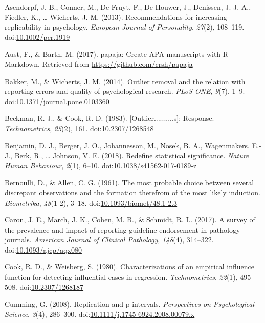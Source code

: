 \documentclass[english,,man,mask]{apa6}
\theoremstyle{definition}
\theoremstyle{definition}
\theoremstyle{definition}
\theoremstyle{remark}
\begin{document}
\hypertarget{refs}{}
\hypertarget{ref-Asendorpf2012}{}
Asendorpf, J. B., Conner, M., De Fruyt, F., De Houwer, J., Denissen, J.
J. A., Fiedler, K., \ldots{} Wicherts, J. M. (2013). Recommendations for
increasing replicability in psychology. \emph{European Journal of
Personality}, \emph{27}(2), 108--119.
doi:\href{https://doi.org/10.1002/per.1919}{10.1002/per.1919}

\hypertarget{ref-Aust2017}{}
Aust, F., \& Barth, M. (2017). papaja: Create APA manuscripts with R
Markdown. Retrieved from \url{https://github.com/crsh/papaja}

\hypertarget{ref-Bakker2014}{}
Bakker, M., \& Wicherts, J. M. (2014). Outlier removal and the relation
with reporting errors and quality of psychological research. \emph{PLoS
ONE}, \emph{9}(7), 1--9.
doi:\href{https://doi.org/10.1371/journal.pone.0103360}{10.1371/journal.pone.0103360}

\hypertarget{ref-Beckman1983}{}
Beckman, R. J., \& Cook, R. D. (1983). {[}Outlier..........s{]}:
Response. \emph{Technometrics}, \emph{25}(2), 161.
doi:\href{https://doi.org/10.2307/1268548}{10.2307/1268548}

\hypertarget{ref-Benjamin2018}{}
Benjamin, D. J., Berger, J. O., Johannesson, M., Nosek, B. A.,
Wagenmakers, E.-J., Berk, R., \ldots{} Johnson, V. E. (2018). Redefine
statistical significance. \emph{Nature Human Behaviour}, \emph{2}(1),
6--10.
doi:\href{https://doi.org/10.1038/s41562-017-0189-z}{10.1038/s41562-017-0189-z}

\hypertarget{ref-Bernoulli1777}{}
Bernoulli, D., \& Allen, C. G. (1961). The most probable choice between
several discrepant observations and the formation therefrom of the most
likely induction. \emph{Biometrika}, \emph{48}(1-2), 3--18.
doi:\href{https://doi.org/10.1093/biomet/48.1-2.3}{10.1093/biomet/48.1-2.3}

\hypertarget{ref-Caron2017}{}
Caron, J. E., March, J. K., Cohen, M. B., \& Schmidt, R. L. (2017). A
survey of the prevalence and impact of reporting guideline endorsement
in pathology journals. \emph{American Journal of Clinical Pathology},
\emph{148}(4), 314--322.
doi:\href{https://doi.org/10.1093/ajcp/aqx080}{10.1093/ajcp/aqx080}

\hypertarget{ref-Cook1980}{}
Cook, R. D., \& Weisberg, S. (1980). Characterizations of an empirical
influence function for detecting influential cases in regression.
\emph{Technometrics}, \emph{22}(1), 495--508.
doi:\href{https://doi.org/10.2307/1268187}{10.2307/1268187}

\hypertarget{ref-Cumming2008}{}
Cumming, G. (2008). Replication and p intervals. \emph{Perspectives on
Psychological Science}, \emph{3}(4), 286--300.
doi:\href{https://doi.org/10.1111/j.1745-6924.2008.00079.x}{10.1111/j.1745-6924.2008.00079.x}
\end{document}
